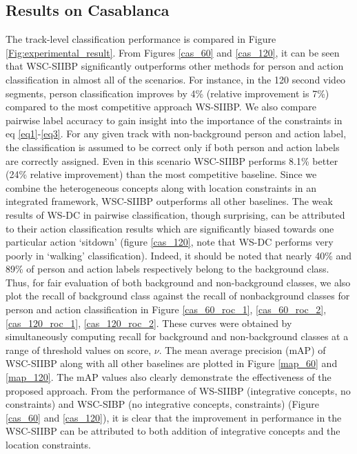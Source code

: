\documentclass[runningheads]{llncs}
\begin{document}
\subsection{Results on Casablanca}
\label{sec:res_casa}
The track-level classification performance is compared in Figure \ref{Fig:experimental_result}. From Figures \ref{cas_60} and \ref{cas_120}, it can be seen that WSC-SIIBP significantly outperforms other methods for person and action classification in almost all of the scenarios. For instance, in the 120 second video segments, person classification improves by 4\% (relative improvement is 7\%) compared to the most competitive approach WS-SIIBP. We also compare pairwise label accuracy to gain insight into the importance of the constraints in eq \eqref{eq1}-\eqref{eq3}. For any given track with non-background person and action label, the classification is assumed to be correct only if both person and action labels are correctly assigned. Even in this scenario WSC-SIIBP performs 8.1\% better (24\% relative improvement) than the most competitive baseline. Since we combine the heterogeneous concepts along with location constraints in an integrated framework, WSC-SIIBP outperforms all other baselines. The weak results of WS-DC in pairwise classification, though surprising, can be attributed to their action classification results which are significantly biased towards one particular action `sitdown' (figure \ref{cas_120}, note that WS-DC performs very poorly in `walking' classification). Indeed, it should be noted that nearly 40\% and 89\% of person and action labels respectively belong to the background class. Thus, for fair evaluation of both background and non-background classes,  we also plot the recall of background class against the recall of nonbackground classes for person and action classification in Figure \ref{cas_60_roc_1}, \ref{cas_60_roc_2}, \ref{cas_120_roc_1}, \ref{cas_120_roc_2}. These curves were obtained by simultaneously computing recall for background and non-background classes at a range of threshold values on score, $\nu$. The mean average precision (mAP) of WSC-SIIBP along with all other baselines are plotted in Figure \ref{map_60} and \ref{map_120}. The mAP values also clearly demonstrate the effectiveness of the proposed approach. From the performance of WS-SIIBP (integrative concepts, no constraints) and WSC-SIBP (no integrative concepts, constraints) (Figure \ref{cas_60} and \ref{cas_120}), it is clear that the improvement in performance in the WSC-SIIBP can be attributed to both addition of integrative concepts and the location constraints.
\end{document}
